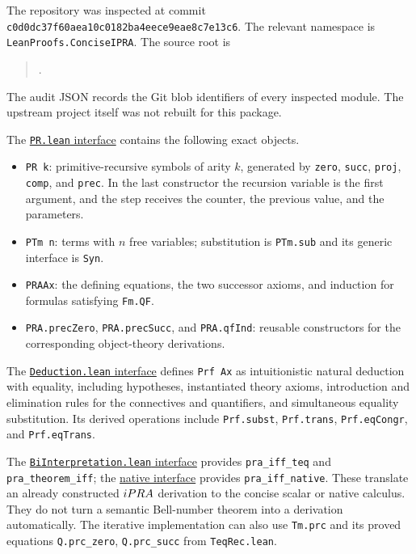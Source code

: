 The repository was inspected at commit
\texttt{c0d0dc37f60aea10c0182ba4eece9eae8c7e13c6}.
The relevant namespace is \texttt{LeanProofs.ConciseIPRA}.
The source root is
\begin{quote}\small
{}.
\end{quote}
The audit JSON records the Git blob identifiers of every inspected module.
The upstream project itself was not rebuilt for this package.

The
\href{https://github.com/VladimirReshetnikov/ProveIt/blob/c0d0dc37f60aea10c0182ba4eece9eae8c7e13c6/Logic/PrimitiveRecursiveArithmetic/ConciseIPRA/Lean/ConciseIPRA/PR.lean}{\texttt{PR.lean} interface}
contains the following exact objects.
\begin{itemize}
\item \texttt{PR k}: primitive-recursive symbols of arity $k$, generated by
\texttt{zero}, \texttt{succ}, \texttt{proj}, \texttt{comp}, and
\texttt{prec}. In the last constructor the recursion variable is the first
argument, and the step receives the counter, the previous value, and the
parameters.
\item \texttt{PTm n}: terms with $n$ free variables; substitution is
\texttt{PTm.sub} and its generic interface is \texttt{Syn}.
\item \texttt{PRAAx}: the defining equations, the two successor axioms, and
induction for formulas satisfying \texttt{Fm.QF}.
\item \texttt{PRA.precZero}, \texttt{PRA.precSucc}, and
\texttt{PRA.qfInd}: reusable constructors for the corresponding
object-theory derivations.
\end{itemize}
The
\href{https://github.com/VladimirReshetnikov/ProveIt/blob/c0d0dc37f60aea10c0182ba4eece9eae8c7e13c6/Logic/PrimitiveRecursiveArithmetic/ConciseIPRA/Lean/ConciseIPRA/Deduction.lean}{\texttt{Deduction.lean} interface}
defines \texttt{Prf Ax} as intuitionistic natural deduction with equality,
including hypotheses, instantiated theory axioms, introduction and
elimination rules for the connectives and quantifiers, and simultaneous
equality substitution. Its derived operations include \texttt{Prf.subst},
\texttt{Prf.trans}, \texttt{Prf.eqCongr}, and \texttt{Prf.eqTrans}.

The
\href{https://github.com/VladimirReshetnikov/ProveIt/blob/c0d0dc37f60aea10c0182ba4eece9eae8c7e13c6/Logic/PrimitiveRecursiveArithmetic/ConciseIPRA/Lean/ConciseIPRA/BiInterpretation.lean}{\texttt{BiInterpretation.lean} interface}
provides \texttt{pra\_iff\_teq} and \texttt{pra\_theorem\_iff}; the
\href{https://github.com/VladimirReshetnikov/ProveIt/blob/c0d0dc37f60aea10c0182ba4eece9eae8c7e13c6/Logic/PrimitiveRecursiveArithmetic/ConciseIPRA/Lean/ConciseIPRA/NativeBiInterpretation.lean}{native interface}
provides \texttt{pra\_iff\_native}. These translate an already constructed
$iPRA$ derivation to the concise scalar or native calculus. They do not
turn a semantic Bell-number theorem into a derivation automatically. The
iterative implementation can also use \texttt{Tm.prc} and its proved
equations \texttt{Q.prc\_zero}, \texttt{Q.prc\_succ} from
\texttt{TeqRec.lean}.


